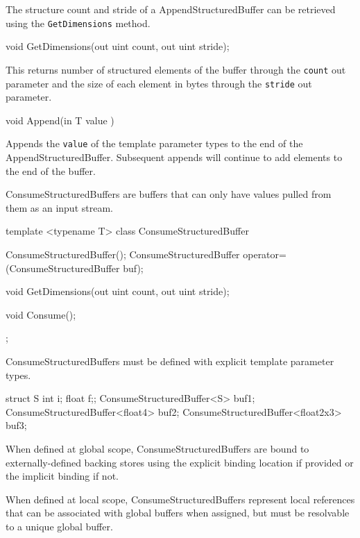 
The structure count and stride of a AppendStructuredBuffer can be retrieved using the \texttt{GetDimensions} method.
\begin{HLSL}
void GetDimensions(out uint count, out uint stride);
\end{HLSL}

This returns number of structured elements of the buffer through the \texttt{count} out parameter
and the size of each element in bytes through the \texttt{stride} out parameter.


\begin{HLSL}
   void Append(in T value )
\end{HLSL}

Appends the \texttt{value} of the template parameter types to the end of the AppendStructuredBuffer.
Subsequent appends will continue to add elements to the end of the buffer.


ConsumeStructuredBuffers are buffers that can only have values pulled from them as an input stream.

\begin{HLSL}
template <typename T>
 class ConsumeStructuredBuffer {
   ConsumeStructuredBuffer();
   ConsumeStructuredBuffer operator=(ConsumeStructuredBuffer buf);

   void GetDimensions(out uint count, out uint stride);

   void Consume();
};
\end{HLSL}


ConsumeStructuredBuffers must be defined with explicit template parameter types.
\begin{HLSL}
  struct S {int i; float f;};
  ConsumeStructuredBuffer<S> buf1;
  ConsumeStructuredBuffer<float4> buf2;
  ConsumeStructuredBuffer<float2x3> buf3;
\end{HLSL}

When defined at global scope, ConsumeStructuredBuffers are bound to externally-defined backing stores
using the explicit binding location if provided or the implicit binding if not.

When defined at local scope, ConsumeStructuredBuffers represent local references
that can be associated with global buffers when assigned,
but must be resolvable to a unique global buffer.

